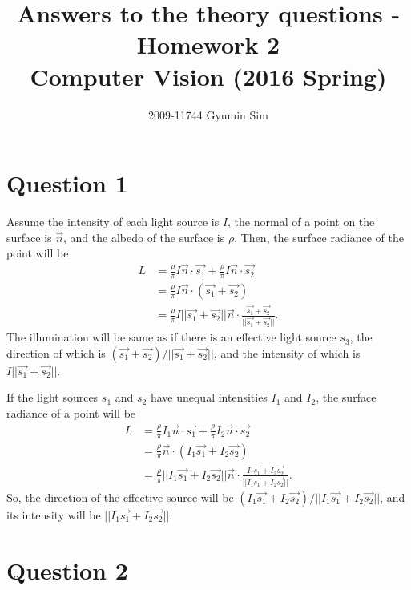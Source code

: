 \documentclass[a4paper,10pt]{article}
\begin{document}
\title{Answers to the theory questions - Homework 2 \\
  \large Computer Vision (2016 Spring)}
\author{2009-11744 Gyumin Sim}
\maketitle

\section*{Question 1}

Assume the intensity of each light source is $I$,
the normal of a point on the surface is $\vec{n}$,
and the albedo of the surface is $\rho$.
Then, the surface radiance of the point will be
\begin{align*}
L &= \frac{\rho}{\pi} I \vec{n} \cdot \vec{s_1} + \frac{\rho}{\pi} I \vec{n} \cdot \vec{s_2} \\
&= \frac{\rho}{\pi} I \vec{n} \cdot ( \vec{s_1} + \vec{s_2} ) \\
&= \frac{\rho}{\pi} I || \vec{s_1} + \vec{s_2} || \vec{n} \cdot \frac{ \vec{s_1} + \vec{s_2} }{ || \vec{s_1} + \vec{s_2} || }.
\end{align*}
The illumination will be same as if there is an effective light source $s_3$, the direction of which is
$( \vec{s_1} + \vec{s_2} ) / || \vec{s_1} + \vec{s_2} || $,
and the intensity of which is
$I || \vec{s_1} + \vec{s_2} ||$.

If the light sources $s_1$ and $s_2$ have unequal intensities $I_1$ and $I_2$,
the surface radiance of a point will be
\begin{align*}
L &= \frac{\rho}{\pi} I_1 \vec{n} \cdot \vec{s_1} + \frac{\rho}{\pi} I_2 \vec{n} \cdot \vec{s_2} \\
&= \frac{\rho}{\pi} \vec{n} \cdot ( I_1 \vec{s_1} + I_2 \vec{s_2} ) \\
&= \frac{\rho}{\pi} || I_1 \vec{s_1} + I_2 \vec{s_2} || \vec{n} \cdot \frac{ I_1 \vec{s_1} + I_2 \vec{s_2} }{ || I_1 \vec{s_1} + I_2 \vec{s_2} || }.
\end{align*}
So, the direction of the effective source will be
$( I_1 \vec{s_1} + I_2 \vec{s_2} ) / || I_1 \vec{s_1} + I_2 \vec{s_2} ||$,
and its intensity will be
$|| I_1 \vec{s_1} + I_2 \vec{s_2} ||$.

\section*{Question 2}
\end{document}
